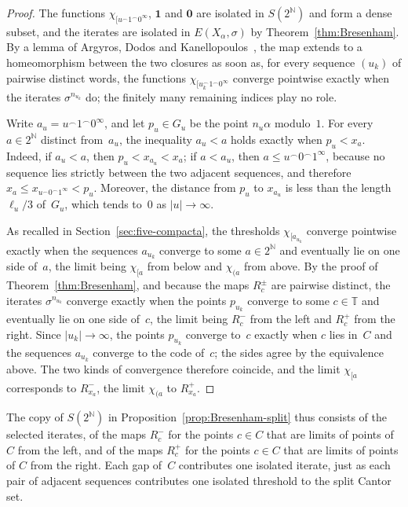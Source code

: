 \documentclass[psamsfonts]{amsart}
\theoremstyle{definition}
\theoremstyle{remark}
\numberwithin{equation}{section}
\begin{document}
\begin{proof}
  The functions $\chi_{[u^\frown1^\frown0^\infty}$, $\mathbf{1}$ and $\mathbf{0}$ are isolated in $S(2^{\mathbb{N}})$ and form a dense subset, and the iterates are isolated in $E(X_\alpha,\sigma)$ by Theorem~\ref{thm:Bresenham}.
  By a lemma of Argyros, Dodos and Kanellopoulos~\cite[Lemma~19]{argyros2008rosenthal}, the map extends to a homeomorphism between the two closures as soon as, for every sequence $(u_k)$ of pairwise distinct words, the functions $\chi_{[u_k^\frown1^\frown0^\infty}$ converge pointwise exactly when the iterates $\sigma^{n_{u_k}}$ do; the finitely many remaining indices play no role.

  Write $a_u=u^\frown1^\frown0^\infty$, and let $p_u\in G_u$ be the point $n_u\alpha$ modulo~$1$.
  For every $a\in2^{\mathbb{N}}$ distinct from~$a_u$, the inequality $a_u<a$ holds exactly when $p_u<x_a$.
  Indeed, if $a_u<a$, then $p_u<x_{a_u}<x_a$; if $a<a_u$, then $a\le u^\frown0^\frown1^\infty$, because no sequence lies strictly between the two adjacent sequences, and therefore $x_a\le x_{u^\frown0^\frown1^\infty}<p_u$.
  Moreover, the distance from $p_u$ to $x_{a_u}$ is less than the length $\ell_u/3$ of~$G_u$, which tends to~$0$ as $|u|\to\infty$.

  As recalled in Section~\ref{sec:five-compacta}, the thresholds $\chi_{[a_{u_k}}$ converge pointwise exactly when the sequences $a_{u_k}$ converge to some $a\in2^{\mathbb{N}}$ and eventually lie on one side of~$a$, the limit being $\chi_{[a}$ from below and $\chi_{(a}$ from above.
  By the proof of Theorem~\ref{thm:Bresenham}, and because the maps $R_c^\pm$ are pairwise distinct, the iterates $\sigma^{n_{u_k}}$ converge exactly when the points $p_{u_k}$ converge to some $c\in\mathbb{T}$ and eventually lie on one side of~$c$, the limit being $R_c^-$ from the left and $R_c^+$ from the right.
  Since $|u_k|\to\infty$, the points $p_{u_k}$ converge to~$c$ exactly when $c$ lies in~$C$ and the sequences $a_{u_k}$ converge to the code of~$c$; the sides agree by the equivalence above.
  The two kinds of convergence therefore coincide, and the limit $\chi_{[a}$ corresponds to $R^-_{x_a}$, the limit $\chi_{(a}$ to $R^+_{x_a}$.
\end{proof}

The copy of $S(2^{\mathbb{N}})$ in Proposition~\ref{prop:Bresenham-split} thus consists of the selected iterates, of the maps $R_c^-$ for the points $c\in C$ that are limits of points of $C$ from the left, and of the maps $R_c^+$ for the points $c\in C$ that are limits of points of $C$ from the right.
Each gap of~$C$ contributes one isolated iterate, just as each pair of adjacent sequences contributes one isolated threshold to the split Cantor set.
\end{document}
